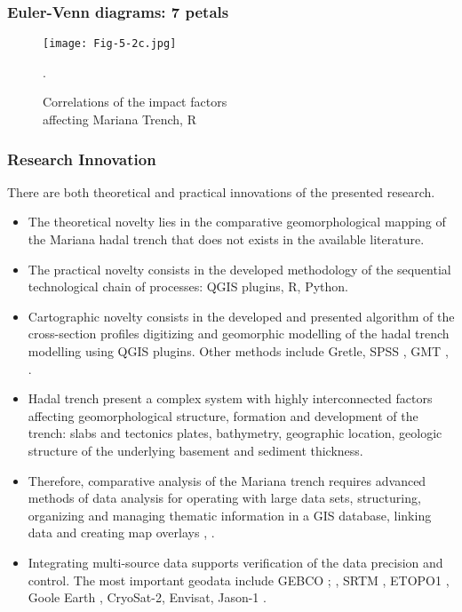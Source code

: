 \documentclass[pdflatex,compress,8pt,
	xcolor={dvipsnames,dvipsnames,svgnames,x11names,table},
	hyperref={colorlinks = true,breaklinks = true, urlcolor = NavyBlue, breaklinks = true}]{beamer}
\begin{document}
\begin{frame}\frametitle{Euler-Venn diagrams: 7 petals}
\begin{figure}[H]
	\centering
		\texttt{[image: Fig-5-2c.jpg]}\caption{Correlations of the impact factors \\affecting Mariana Trench, R}.
\end{figure}		
\end{frame}

\begin{frame}\frametitle{Research Innovation}
\normalsize
There are both theoretical and practical innovations of the presented research. 

\begin{itemize}
            \item The theoretical novelty lies in the comparative geomorphological mapping of the Mariana hadal trench that does not exists in the available literature. 
            \item The practical novelty consists in the developed methodology of the sequential technological chain of processes: QGIS plugins, R, Python.
            \item Cartographic novelty consists in the developed and presented algorithm of the cross-section profiles digitizing and geomorphic modelling of the  hadal trench modelling using QGIS plugins. Other methods include Gretle, SPSS \cite{Lemenkova201990}, GMT \cite{Lemenkova201995}, \cite{Lemenkova201994}.
            \item Hadal trench present a complex system with highly interconnected factors affecting geomorphological structure, formation and development of the trench: slabs and tectonics plates, bathymetry, geographic location, geologic structure of the underlying basement and sediment thickness. 
            \item Therefore, comparative analysis of the Mariana trench requires advanced methods of data analysis for operating with large data sets, structuring, organizing and managing thematic information in a GIS database, linking data and creating map overlays \cite{Lemenkova201540}, \cite{Lemenkova2016e}. 
            \item Integrating multi-source data supports verification of the data precision and control. The most important geodata include GEBCO \cite{Mayeretal2018}; \cite{Monahan2004}, SRTM \cite{Beckeretal2009}, ETOPO1 \cite{AmanteEakins2009}, Goole Earth \cite{Lemenkova201510}, CryoSat-2, Envisat, Jason-1 \cite{Sandwelletal2013}.
\end{itemize}

\end{frame}
\end{document}
